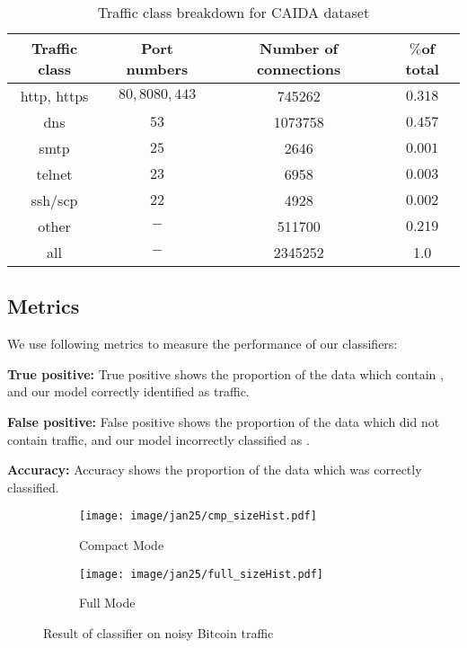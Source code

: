 \begin{table}
\center \caption{Traffic class breakdown for CAIDA dataset}\label{tab:traffic_class}
\begin{tabular}{|c|c|c|c|}
\hline
 Traffic class& Port numbers &Number of connections&$\%$of total\\
      \hline
		http, https& $80, 8080, 443$&745262&$0.318$\\
		dns& $53$&1073758&$0.457$\\
		smtp& $25$&2646&$0.001$\\
		telnet&$23$&6958&$0.003$\\
		ssh/scp&$22$&4928&$0.002$\\
		other&$-$&511700&$0.219$\\
		all &$-$&2345252&1.0\\
\hline
\end{tabular}
\end{table}

\subsection{Metrics}

We use following metrics to measure the performance of our classifiers:
\begin{compactitem}
\item \textbf{True positive:} True positive shows the proportion of the data which contain \bc, and our model correctly identified as \bc traffic.
\item \textbf{False positive:} False positive shows the proportion of the data which did  not contain \bc traffic, and our model incorrectly classified as \bc.
\item \textbf{Accuracy:} Accuracy shows the proportion of the data which was correctly classified.
\end{compactitem}
\begin{figure*}

\begin{subfigure}{0.48\linewidth}
\centering
\texttt{[image: image/jan25/cmp\_sizeHist.pdf]}
\caption{Compact Mode}
\label{fig:vanilla_sizeTor}
\end{subfigure}
\begin{subfigure}{0.48\linewidth}
\centering
\texttt{[image: image/jan25/full\_sizeHist.pdf]}
\caption{Full Mode}
\label{fig:vanilla_d2u}
\end{subfigure}
\caption{Result of  classifier on noisy Bitcoin traffic}
\label{fig:sizeHist_non}
\end{figure*} 
